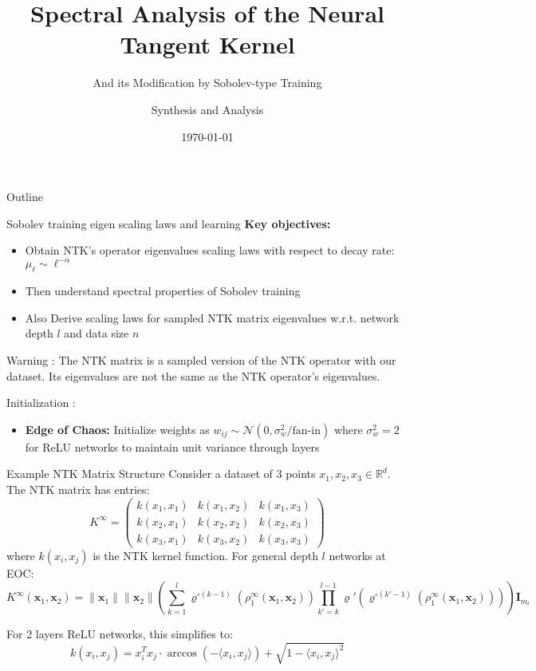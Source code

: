 \documentclass{beamer}
\title{Spectral Analysis of the Neural Tangent Kernel}
\subtitle{And its Modification by Sobolev-type Training}
\author{Synthesis and Analysis}
\date{\today}
\begin{document}
\begin{frame}
\titlepage
\end{frame}

\begin{frame}{Outline}
\tableofcontents
\end{frame}






\begin{frame}{Sobolev training eigen scaling laws and learning}
\textbf{Key objectives:}
\begin{itemize}
\item Obtain NTK's operator eigenvalues scaling laws with respect to decay rate: $\mu_\ell \sim \ell^{-\alpha}$
\item Then understand spectral properties of Sobolev training
\item Also Derive scaling laws for sampled NTK matrix eigenvalues w.r.t. network depth $l$ and data size $n$
\end{itemize}

Warning : The NTK matrix is a sampled version of the NTK operator with our dataset. Its eigenvalues are not the same as the NTK operator's eigenvalues.

Initialization : 
\begin{itemize}
\item \textbf{Edge of Chaos:} Initialize weights as $w_{ij} \sim \mathcal{N}(0, \sigma_w^2/\text{fan-in})$ where $\sigma_w^2 = 2$ 
for ReLU networks to maintain unit variance through layers
\end{itemize}
\end{frame}




\begin{frame}{Example NTK Matrix Structure}
Consider a dataset of 3 points $x_1, x_2, x_3 \in \mathbb{R}^d$. The NTK matrix has entries:
\[
K^{\infty} = \begin{pmatrix} 
k(x_1,x_1) & k(x_1,x_2) & k(x_1,x_3) \\
k(x_2,x_1) & k(x_2,x_2) & k(x_2,x_3) \\
k(x_3,x_1) & k(x_3,x_2) & k(x_3,x_3)
\end{pmatrix}
\]
where $k(x_i,x_j)$ is the NTK kernel function. For general depth $l$ networks at EOC:
\[
K^{\infty}(\mathbf{x}_1, \mathbf{x}_2) = \|\mathbf{x}_1\| \|\mathbf{x}_2\| \left( \sum_{k=1}^l \varrho^{\circ (k-1)}\left(\rho_1^{\infty}(\mathbf{x}_1, \mathbf{x}_2)\right) \prod_{k'=k}^{l-1} \varrho'\left(\varrho^{\circ (k'-1)}\left(\rho_1^{\infty}(\mathbf{x}_1, \mathbf{x}_2)\right)\right) \right) \mathbf{I}_{m_l}
\]

For 2 layers ReLU networks, this simplifies to:
\[
k(x_i,x_j) = x_i^T x_j \cdot \arccos(-\langle x_i,x_j \rangle) + \sqrt{1-\langle x_i,x_j \rangle^2}
\]

\end{frame}
\end{document}
